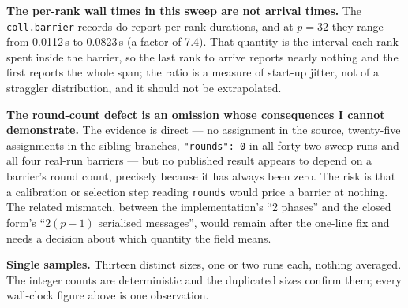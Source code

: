 \documentclass[11pt]{article}
\begin{document}
\textbf{The per-rank wall times in this sweep are not arrival times.} The \texttt{coll.barrier}
records do report per-rank durations, and at $p=32$ they range from 0.0112\,s to 0.0823\,s (a
factor of 7.4). That quantity is the interval each rank spent inside the barrier, so the last
rank to arrive reports nearly nothing and the first reports the whole span; the ratio is a
measure of start-up jitter, not of a straggler distribution, and it should not be extrapolated.

\textbf{The round-count defect is an omission whose consequences I cannot demonstrate.} The
evidence is direct --- no assignment in the source, twenty-five assignments in the sibling
branches, \texttt{"rounds": 0} in all forty-two sweep runs and all four real-run barriers --- but
no published result appears to depend on a barrier's round count, precisely because it has
always been zero. The risk is that a calibration or selection step reading \texttt{rounds} would
price a barrier at nothing. The related mismatch, between the implementation's ``2 phases'' and
the closed form's ``$2(p-1)$ serialised messages'', would remain after the one-line fix and
needs a decision about which quantity the field means.

\textbf{Single samples.} Thirteen distinct sizes, one or two runs each, nothing averaged. The
integer counts are deterministic and the duplicated sizes confirm them; every wall-clock figure
above is one observation.
\end{document}

